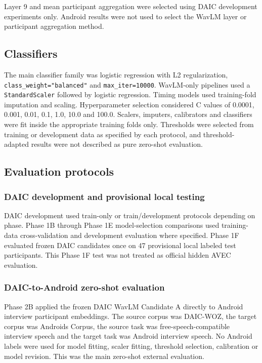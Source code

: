 \documentclass[lettersize,journal]{IEEEtran}
\begin{document}
Layer 9 and mean participant aggregation were selected using DAIC development experiments only. Android results were not used to select the WavLM layer or participant aggregation method.

\subsection{Classifiers}

The main classifier family was logistic regression with L2 regularization, \texttt{class\_weight="balanced"} and \texttt{max\_iter=10000}. WavLM-only pipelines used a \texttt{StandardScaler} followed by logistic regression. Timing models used training-fold imputation and scaling. Hyperparameter selection considered C values of 0.0001, 0.001, 0.01, 0.1, 1.0, 10.0 and 100.0. Scalers, imputers, calibrators and classifiers were fit inside the appropriate training folds only. Thresholds were selected from training or development data as specified by each protocol, and threshold-adapted results were not described as pure zero-shot evaluation.

\subsection{Evaluation protocols}

\subsubsection{DAIC development and provisional local testing}

DAIC development used train-only or train/development protocols depending on phase. Phase 1B through Phase 1E model-selection comparisons used training-data cross-validation and development evaluation where specified. Phase 1F evaluated frozen DAIC candidates once on 47 provisional local labeled test participants. This Phase 1F test was not treated as official hidden AVEC evaluation.

\subsubsection{DAIC-to-Android zero-shot evaluation}

Phase 2B applied the frozen DAIC WavLM Candidate A directly to Android interview participant embeddings. The source corpus was DAIC-WOZ, the target corpus was Androids Corpus, the source task was free-speech-compatible interview speech and the target task was Android interview speech. No Android labels were used for model fitting, scaler fitting, threshold selection, calibration or model revision. This was the main zero-shot external evaluation.
\end{document}
